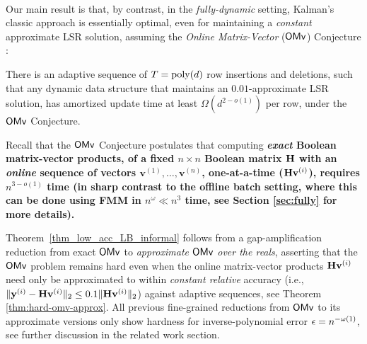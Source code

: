 \

Our main result is that, by contrast, in the \emph{fully-dynamic} setting, Kalman's classic approach is essentially optimal, even for maintaining a \emph{constant} approximate LSR solution, assuming the \emph{Online Matrix-Vector} ($\mathsf{OMv}$) Conjecture \cite{hkns}: 

\begin{theorem} \label{thm_low_acc_LB_informal}
There is an adaptive sequence of $T = \operatorname{poly}(d)$ row insertions and deletions, such that any dynamic data structure that maintains an $0.01$-approximate LSR solution, has amortized update time at least $\Omega(d^{2-o(1)})$ per row, under the $\mathsf{OMv}$ Conjecture. 
\end{theorem}



Recall that the $\mathsf{OMv}$ Conjecture \cite{hkns} postulates that computing \bf \emph{exact} \rm Boolean matrix-vector products, of a fixed $n\times n$ Boolean matrix $\mathbf{H}$ with an \emph{online} sequence of vectors $\mathbf{v}^{(1)}, \ldots, \mathbf{v}^{(n)}$, one-at-a-time ($\mathbf{H}\mathbf{v}^{(i)}$),  requires $n^{3-o(1)}$ time (in sharp contrast to the offline batch setting, where this can be done using FMM in $n^\omega\ll n^3$ time, see Section \ref{sec:fully} for more details). 

Theorem~\ref{thm_low_acc_LB_informal} follows from a gap-amplification reduction from exact $\mathsf{OMv}$ to \emph{approximate $\mathsf{OMv}$} {\em over the reals}, asserting that the $\mathsf{OMv}$ problem remains hard even when the online matrix-vector products $\mathbf{H}\mathbf{v}^{(i)}$ need only be approximated to within \emph{constant relative} accuracy (i.e., $\| \mathbf{y}^{(i)} - \mathbf{H}\mathbf{v}^{(i)} \|_2 \leq 0.1 \|\mathbf{H}\mathbf{v}^{(i)}\|_2$) against adaptive sequences, see Theorem \ref{thm:hard-omv-approx}. 
All previous fine-grained reductions from $\mathsf{OMv}$ to its approximate versions only show hardness for inverse-polynomial error $\epsilon = n^{-\omega(1)}$, see further discussion in the related work section. 

